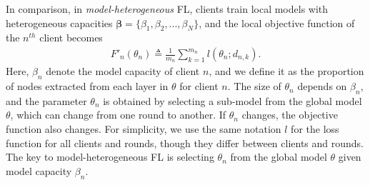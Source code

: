 \documentclass{article}
\begin{document}
In comparison, in \textit{model-heterogeneous} FL, clients train local models with heterogeneous capacities $\boldsymbol{{\beta}}=\{\beta_1, \beta_2, ..., \beta_N\}$, and 
the local objective function of the $n^{th}$ client becomes
\begin{align}
    F'_n(\theta_n) \triangleq \frac{1}{m_n} \sum_{k=1}^{m_n} l(\theta_n; d_{n,k}).
    \label{eqn:fed_obj}
\end{align}
Here, $\beta_n$ denote the model capacity of client $n$, and we define it as the proportion of nodes extracted from each layer in $\theta$ for client $n$. 
The size of $\theta_n$ depends on $\beta_n$, and the parameter $\theta_n$ is obtained by selecting a sub-model from the global model $\theta$, which can change from one round to another. If $\theta_n$ changes, the objective function also changes. For simplicity, we use the same notation $l$ for the loss function for all clients and rounds, though they differ between clients and rounds. The key to model-heterogeneous FL is selecting $\theta_n$ from the global model $\theta$ given model capacity $\beta_n$. 



\end{document}
